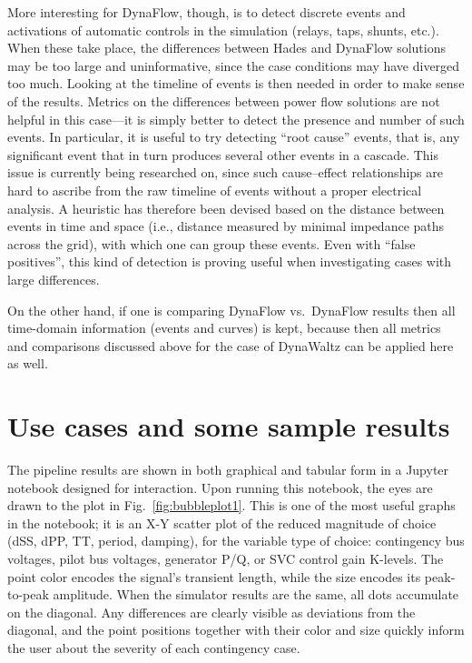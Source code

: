 \documentclass[conference]{IEEEtran}
\begin{document}
More interesting for DynaFlow, though, is to detect discrete events and
activations of automatic controls in the simulation (relays, taps, shunts,
etc.).  When these take place, the differences between Hades and DynaFlow
solutions may be too large and uninformative, since the case conditions may have
diverged too much.  Looking at the timeline of events is then needed in order to
make sense of the results.  Metrics on the differences between power flow
solutions are not helpful in this case---it is simply better to detect the
presence and number of such events.  In particular, it is useful to try
detecting ``root cause'' events, that is, any significant event that in turn
produces several other events in a cascade. This issue is currently being
researched on, since such cause--effect relationships are hard to ascribe from
the raw timeline of events without a proper electrical analysis. A heuristic has
therefore been devised based on the distance between events in time and space
(i.e., distance measured by minimal impedance paths across the grid), with which
one can group these events.  Even with ``false positives'', this kind of
detection is proving useful when investigating cases with large differences.

On the other hand, if one is comparing DynaFlow vs.\ DynaFlow results then all
time-domain information (events and curves) is kept, because then all metrics
and comparisons discussed above for the case of DynaWaltz can be applied here as
well.




\section{Use cases and some sample results}

The pipeline results are shown in both graphical and tabular form in a Jupyter
notebook designed for interaction.  Upon running this notebook, the eyes are
drawn to the plot in Fig.~\ref{fig:bubbleplot1}.  This is one of the most useful
graphs in the notebook; it is an X-Y scatter plot of the reduced magnitude of
choice (dSS, dPP, TT, period, damping), for the variable type of choice:
contingency bus voltages, pilot bus voltages, generator P/Q, or SVC control gain
K-levels. The point color encodes the signal's transient length, while the size
encodes its peak-to-peak amplitude.  When the simulator results are the same,
all dots accumulate on the diagonal. Any differences are clearly visible as
deviations from the diagonal, and the point positions together with their color
and size quickly inform the user about the severity of each contingency case.
\end{document}
